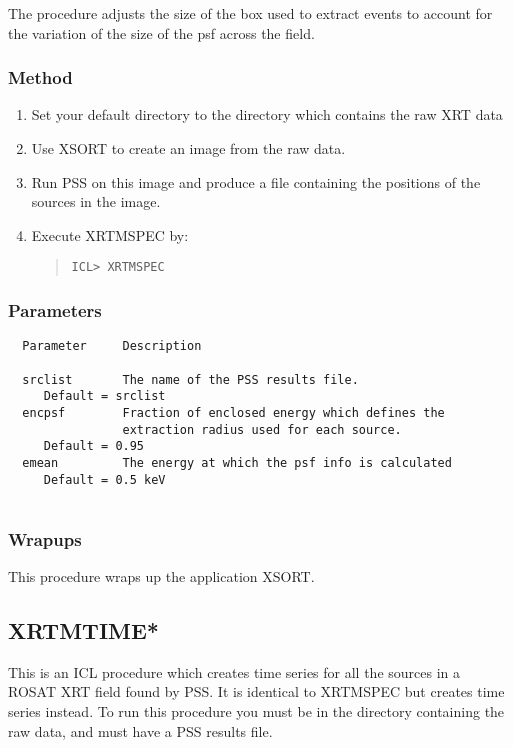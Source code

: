 \documentclass{book}
\renewcommand{\_}{{\tt\char'137}}     %
\begin{document}
The procedure adjusts the size of the box used to extract events
to account for the variation of the size of the psf across the field.
 
\subsubsection{Method}
 
\begin{enumerate}
\item Set your default directory to the directory which contains
the raw XRT data
\item Use XSORT to create an image from the raw data.
\item Run PSS on this image and produce a file containing the
positions of the sources in the image.
\item Execute XRTMSPEC by:
\begin{quote}\begin{verbatim}
ICL> XRTMSPEC
\end{verbatim}\end{quote}
\end{enumerate}
\subsubsection{Parameters}
\begin{verbatim}
  Parameter     Description
 
  srclist       The name of the PSS results file.
     Default = srclist
  encpsf        Fraction of enclosed energy which defines the
                extraction radius used for each source.
     Default = 0.95
  emean         The energy at which the psf info is calculated
     Default = 0.5 keV
 
\end{verbatim}\subsubsection{Wrapups}
This procedure wraps up the application XSORT.
 
\subsection{XRTMTIME*}
This is an ICL procedure which creates time series for all the sources
in a ROSAT XRT field found by PSS. It is identical to XRTMSPEC but
creates time series instead. To run this procedure you must be in the
directory containing the raw data, and must have a PSS results file.
 
\end{document}
